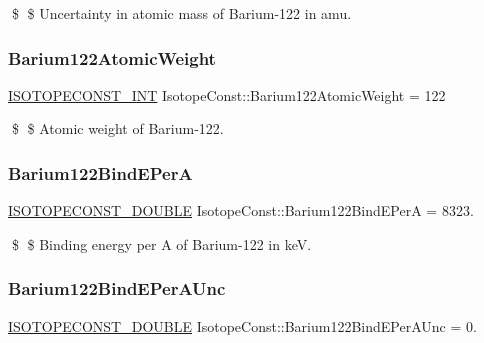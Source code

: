 \$ \$ Uncertainty in atomic mass of Barium-\/122 in amu. \mbox{\label{group___isotope_const-_barium-_ba122_ga950f36cca25081f19d5474887725eb33}} 
\subsubsection{\texorpdfstring{Barium122\+Atomic\+Weight}{Barium122AtomicWeight}}
{\footnotesize\ttfamily \mbox{\hyperlink{group___isotope_const-_macros_ga5f18360b3e99483a35c32d789e62621c}{I\+S\+O\+T\+O\+P\+E\+C\+O\+N\+S\+T\+\_\+\+I\+NT}} Isotope\+Const\+::\+Barium122\+Atomic\+Weight = 122}

\$ \$ Atomic weight of Barium-\/122. \mbox{\label{group___isotope_const-_barium-_ba122_ga6df17c6d7333d9695ca0ab2bdb3868bd}} 
\subsubsection{\texorpdfstring{Barium122\+Bind\+E\+PerA}{Barium122BindEPerA}}
{\footnotesize\ttfamily \mbox{\hyperlink{group___isotope_const-_macros_ga8f45a7272ce02c0b4c65c44636ed719a}{I\+S\+O\+T\+O\+P\+E\+C\+O\+N\+S\+T\+\_\+\+D\+O\+U\+B\+LE}} Isotope\+Const\+::\+Barium122\+Bind\+E\+PerA = 8323.}

\$ \$ Binding energy per A of Barium-\/122 in keV. \mbox{\label{group___isotope_const-_barium-_ba122_gabb69f4e29a9e777000a5f27592c7ac25}} 
\subsubsection{\texorpdfstring{Barium122\+Bind\+E\+Per\+A\+Unc}{Barium122BindEPerAUnc}}
{\footnotesize\ttfamily \mbox{\hyperlink{group___isotope_const-_macros_ga8f45a7272ce02c0b4c65c44636ed719a}{I\+S\+O\+T\+O\+P\+E\+C\+O\+N\+S\+T\+\_\+\+D\+O\+U\+B\+LE}} Isotope\+Const\+::\+Barium122\+Bind\+E\+Per\+A\+Unc = 0.}

